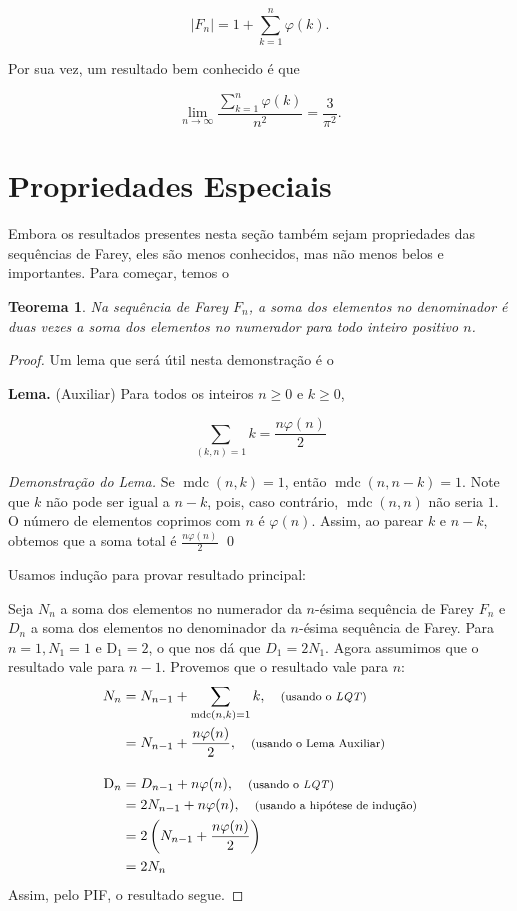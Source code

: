 \documentclass{hipatia}
\newtheorem*{theorem*}{Teorema}
\theoremstyle{definition} %
\begin{document}
$$
\left|F_n\right| = 1 + \sum_{k=1}^{n} \varphi(k).
$$

Por sua vez, um resultado bem conhecido é que 


$$\lim _{n \rightarrow \infty} \frac{\sum_{k=1}^{n} \varphi(k)}{n^2}=\frac{3}{\pi^2}.$$



\section{Propriedades Especiais}

Embora os resultados presentes nesta seção também sejam propriedades das sequências de Farey, eles são menos conhecidos, mas não menos belos e importantes. Para começar, temos o
\begin{theorem*}
Na sequência de Farey \(F_{n}\), a soma dos elementos no denominador é duas vezes a soma dos elementos no numerador para todo inteiro positivo \(n\).
\end{theorem*} 
\begin{proof}
Um lema que será útil nesta demonstração é o

\noindent \textbf{Lema.} (Auxiliar)
    Para todos os inteiros \(n \geq 0\) e \(k \geq 0\),

\[
\sum_{(k, n)=1} k=\frac{n \varphi(n)}{2}
\]


\noindent \textit{Demonstração do Lema.} Se \(\operatorname{mdc}(n, k)=1\), então \(\operatorname{mdc}(n, n-k)=1\). Note que \(k\) não pode ser igual a \(n-k\), pois, caso contrário, \(\operatorname{mdc}(n, n)\) não seria \(1\). O número de elementos coprimos com \(n\) é \(\varphi(n)\). Assim, ao parear \(k\) e \(n-k\), obtemos que a soma total é \(\frac{n \varphi(n)}{2}\)
\qed

    Usamos indução para provar resultado principal:
    
    Seja \(N_{n}\) a soma dos elementos no numerador da \(n\)-ésima sequência de Farey \(F_{n}\) e \(D_{n}\) a soma dos elementos no denominador da \(n\)-ésima sequência de Farey. Para \(n=1, N_{1}=1\) e \(\mathrm{D}_{1}=2\), o que nos dá que
\(D_{1}=2 N_{1}\). Agora assumimos que o resultado vale para \(n-1\). Provemos que o resultado vale para \(n\):
\begin{align*}
N_{n} &= N_{n-1} + \sum_{\operatorname{mdc}(n, k) = 1} k, \quad \text{\footnotesize (usando o \textit{LQT})} \\
&= N_{n-1} + \frac{n \varphi(n)}{2}, \quad \text{\footnotesize (usando o Lema Auxiliar)} \\[10pt]
\mathrm{D}_{n} &= D_{n-1} + n \varphi(n), \quad \text{\footnotesize (usando o \textit{LQT})} \\
&= 2 N_{n-1} + n \varphi(n), \quad \text{\footnotesize (usando a hipótese de indução)} \\
&= 2 \left( N_{n-1} + \frac{n \varphi(n)}{2} \right) \\
&= 2 N_{n}
\end{align*}
Assim, pelo PIF, o resultado segue.
\end{proof} 
\end{document}
